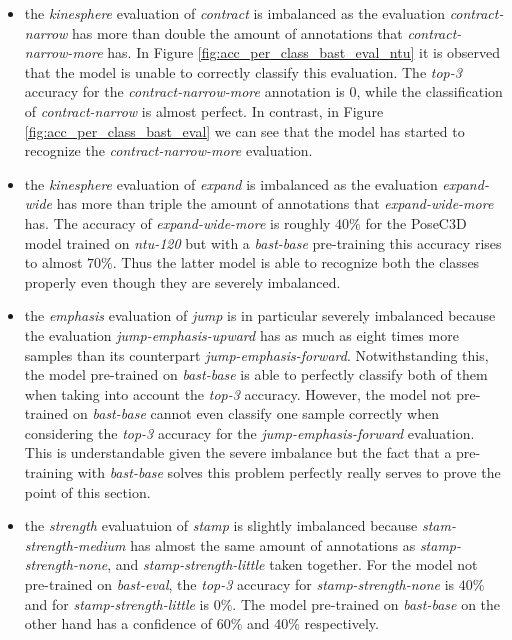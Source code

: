 \documentclass[extern,palatino]{cgMA}
\begin{document}
\begin{itemize}
    \item the \textit{kinesphere} evaluation of \textit{contract} is imbalanced as the evaluation \textit{contract-narrow} has more than double the amount of annotations that \textit{contract-narrow-more} has. In Figure \ref{fig:acc_per_class_bast_eval_ntu} it is observed that the model is unable to correctly classify this evaluation. The \textit{top-3} accuracy for the \textit{contract-narrow-more} annotation is 0, while the classification of \textit{contract-narrow} is almost perfect. In contrast, in Figure \ref{fig:acc_per_class_bast_eval} we can see that the model has started to recognize the \textit{contract-narrow-more} evaluation.
    \item the \textit{kinesphere} evaluation of \textit{expand} is imbalanced as the evaluation \textit{expand-wide} has more than triple the amount of annotations that \textit{expand-wide-more} has. The accuracy of \textit{expand-wide-more} is roughly $40\%$ for the PoseC3D model trained on \textit{ntu-120} but with a \textit{bast-base} pre-training this accuracy rises to almost $70\%$. Thus the latter model is able to recognize both the classes properly even though they are severely imbalanced.
    \item the \textit{emphasis} evaluation of \textit{jump} is in particular severely imbalanced because the evaluation \textit{jump-emphasis-upward} has as much as eight times more samples than its counterpart \textit{jump-emphasis-forward}. Notwithstanding this, the model pre-trained on \textit{bast-base} is able to perfectly classify both of them when taking into account the \textit{top-3} accuracy. However, the model not pre-trained on \textit{bast-base} cannot even classify one sample correctly when considering the \textit{top-3} accuracy for the \textit{jump-emphasis-forward} evaluation. This is understandable given the severe imbalance but the fact that a pre-training with \textit{bast-base} solves this problem perfectly really serves to prove the point of this section.
    \item the \textit{strength} evaluatuion of \textit{stamp} is slightly imbalanced because \textit{stam-strength-medium} has almost the same amount of annotations as \textit{stamp-strength-none}, and \textit{stamp-strength-little} taken together. For the model not pre-trained on \textit{bast-eval}, the \textit{top-3} accuracy for \textit{stamp-strength-none} is $40\%$ and for \textit{stamp-strength-little} is $0\%$. The model pre-trained on \textit{bast-base} on the other hand has a confidence of $60\%$ and $40\%$ respectively.
\end{itemize}
\end{document}
